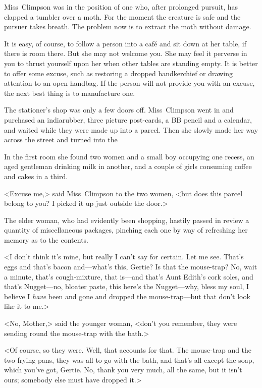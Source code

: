 Miss~Climpson was in the position of one who, after prolonged pursuit, has clapped a tumbler over a moth. For the moment the creature is safe and the pursuer takes breath. The problem now is to extract the moth without damage.

It is easy, of course, to follow a person into a café and sit down at her table, if there is room there. But she may not welcome you. She may feel it perverse in you to thrust yourself upon her when other tables are standing empty. It is better to offer some excuse, such as restoring a dropped handkerchief or drawing attention to an open handbag. If the person will not provide you with an excuse, the next best thing is to manufacture one.

The stationer's shop was only a few doors off. Miss~Climpson went in and purchased an indiarubber, three picture post-cards, a BB pencil and a calendar, and waited while they were made up into a parcel. Then she slowly made her way across the street and turned into the 

In the first room she found two women and a small boy occupying one recess, an aged gentleman drinking milk in another, and a couple of girls consuming coffee and cakes in a third.

<Excuse me,> said Miss~Climpson to the two women, <but does this parcel belong to you? I picked it up just outside the door.>

The elder woman, who had evidently been shopping, hastily passed in review a quantity of miscellaneous packages, pinching each one by way of refreshing her memory as to the contents.

<I don't think it's mine, but really I can't say for certain. Let me see. That's eggs and that's bacon and—what's this, Gertie? Is that the mouse-trap? No, wait a minute, that's cough-mixture, that is—and that's Aunt Edith's cork soles, and that's Nugget—no, bloater paste, this here's the Nugget—why, bless my soul, I believe I \emph{have} been and gone and dropped the mouse-trap—but that don't look like it to me.>

<No, Mother,> said the younger woman, <don't you remember, they were sending round the mouse-trap with the bath.>

<Of course, so they were. Well, that accounts for that. The mouse-trap and the two frying-pans, they was all to go with the bath, and that's all except the soap, which you've got, Gertie. No, thank you very much, all the same, but it isn't ours; somebody else must have dropped it.>

